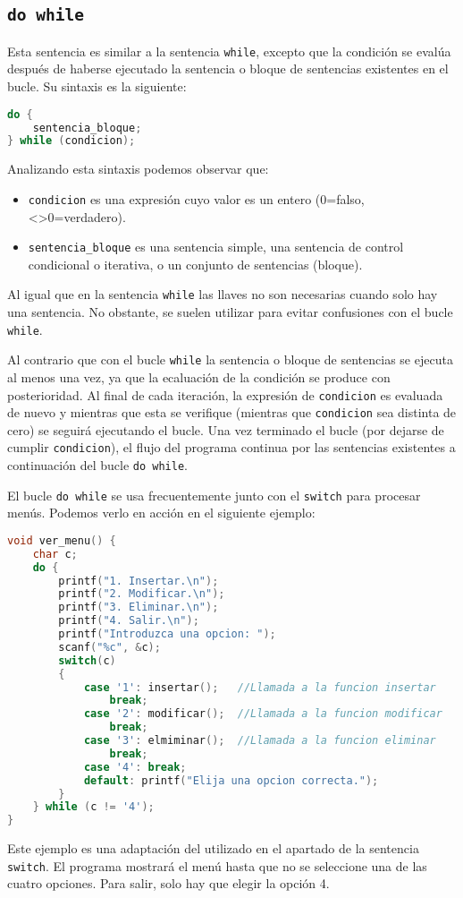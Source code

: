 \subsection{\texttt{do while}}{
Esta sentencia es similar a la sentencia \texttt{while}, excepto que la condición se evalúa después de haberse ejecutado la sentencia o bloque de sentencias existentes en el bucle. Su sintaxis es la siguiente:
\begin{lstlisting}[language=C]
do {
    sentencia_bloque;
} while (condicion);
\end{lstlisting}
Analizando esta sintaxis podemos observar que:
\begin{itemize}
	\item \texttt{condicion} es una expresión cuyo valor es un entero (0=falso, <>0=verdadero).
	\item \texttt{sentencia\_bloque} es una sentencia simple, una sentencia de control condicional o iterativa, o un conjunto de sentencias (bloque).
\end{itemize}
Al igual que en la sentencia \texttt{while} las llaves no son necesarias cuando solo hay una sentencia. No obstante, se suelen utilizar para evitar confusiones con el bucle \texttt{while}.

Al contrario que con el bucle \texttt{while} la sentencia o bloque de sentencias se ejecuta al menos una vez, ya que la ecaluación de la condición se produce con posterioridad. Al final de cada iteración, la expresión de \texttt{condicion} es evaluada de nuevo y mientras que esta se verifique (mientras que \texttt{condicion} sea distinta de cero) se seguirá ejecutando el bucle. Una vez terminado el bucle (por dejarse de cumplir \texttt{condicion}), el flujo del programa continua por las sentencias existentes a continuación del bucle \texttt{do while}.

El bucle \texttt{do while} se usa frecuentemente junto con el \texttt{switch} para procesar menús. Podemos verlo en acción en el siguiente ejemplo:
\begin{Ejemplo}
\begin{lstlisting}[language=C]
void ver_menu() {
    char c;
    do {
        printf("1. Insertar.\n");
        printf("2. Modificar.\n");
        printf("3. Eliminar.\n");
        printf("4. Salir.\n");
        printf("Introduzca una opcion: ");
        scanf("%c", &c);
        switch(c)
        {
            case '1': insertar();	//Llamada a la funcion insertar
                break;
            case '2': modificar();	//Llamada a la funcion modificar
                break;
            case '3': elmiminar();	//Llamada a la funcion eliminar
                break;
            case '4': break;
            default: printf("Elija una opcion correcta.");
        }
    } while (c != '4');
}
\end{lstlisting}
\Explicacion
Este ejemplo es una adaptación del utilizado en el apartado de la sentencia \texttt{switch}. El programa mostrará el menú hasta que no se seleccione una de las cuatro opciones. Para salir, solo hay que elegir la opción 4.
\end{Ejemplo}
}
